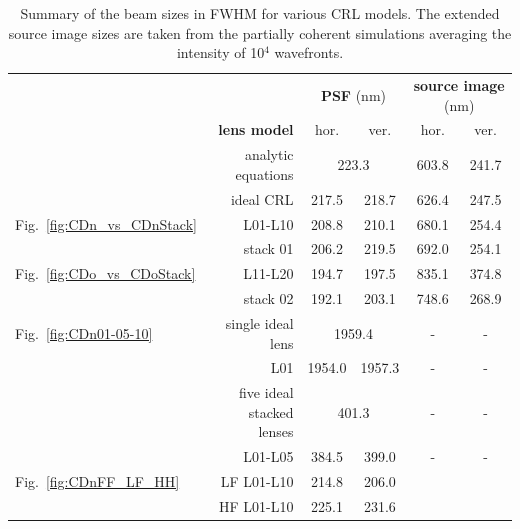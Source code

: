 \begin{refsection}
\begin{table}[]
\caption[FWHM of the PSF for the simulated models in Figs.~\ref{fig:CDn_vs_CDnStack}-\ref{fig:CDnS}]{Summary of the beam sizes in FWHM for various CRL models. The extended source image sizes are taken from the partially coherent simulations averaging the intensity of 10$^{4}$ wavefronts.}\label{tab:beamsizes}\small

\centering
\begin{tabular}{lrcccc}\hline \hline
&                        &\multicolumn{2}{c}{\textbf{PSF} (nm)}   &\multicolumn{2}{c}{\textbf{source image} (nm)}\\
&\textbf{lens model}     &hor.           &ver.                    &hor.            &ver. \\ \cline{2-6}
&analytic equations       &\multicolumn{2}{c}{223.3}           &603.8           &241.7 \\
&ideal CRL               &217.5          &218.7                   &626.4           &247.5 \\ \hline
Fig.~\ref{fig:CDn_vs_CDnStack} &L01-L10  &208.8  &210.1           &680.1           &254.4 \\
&stack 01                &206.2          &219.5                   &692.0           &254.1\\ \hline
Fig.~\ref{fig:CDo_vs_CDoStack} &L11-L20  &194.7  &197.5           &835.1           &374.8 \\
&stack 02                &192.1          &203.1                   &748.6           &268.9 \\ \hline
Fig.~\ref{fig:CDn01-05-10}&single ideal lens  &\multicolumn{2}{c}{1959.4}   & -    & -\\
&L01                     &1954.0         &1957.3                  & -              & - \\
&five ideal stacked lenses  &\multicolumn{2}{c}{401.3}            & -              & - \\
&L01-L05                 &384.5       &399.0                      & -              & - \\ \hline
Fig.~\ref{fig:CDnFF_LF_HH} &LF L01-L10  &214.8     &206.0         &                & \\
&HF L01-L10              &225.1      &231.6                       &                & \\
\hline \hline
\end{tabular}
\end{table}{}



\end{refsection}
